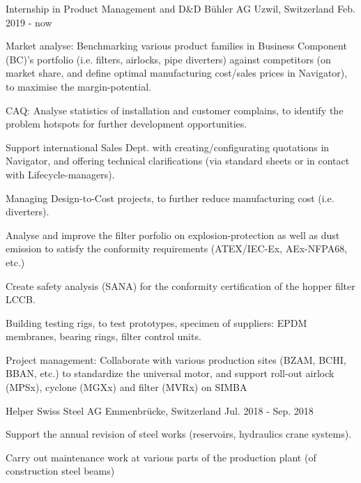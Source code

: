 

\begin{cventries}
	
\cventry
{Internship in Product Management and D\&D} %
{Bühler AG} %
{Uzwil, Switzerland} %
{Feb. 2019 - now} %
{
  \begin{cvitems} %
    \item {Market analyse: Benchmarking various product families in Business Component (BC)'s portfolio (i.e. filters, airlocks, pipe diverters) against competitors (on market share, and define optimal manufacturing cost/sales prices in Navigator), to maximise the margin-potential.}
    \item {CAQ: Analyse statistics of installation and customer complains, to identify the problem hotspots for further development opportunities.}
    \item {Support international Sales Dept. with creating/configurating quotations in Navigator, and offering technical clarifications (via standard sheets or in contact with Lifecycle-managers).}
    \item {Managing Design-to-Cost projects, to further reduce manufacturing cost (i.e. diverters).}
    \item {Analyse and improve the filter porfolio on explosion-protection as well as dust emission to satisfy the conformity requirements (ATEX/IEC-Ex, AEx-NFPA68, etc.)}
    \item {Create safety analysis (SANA) for the conformity certification of the hopper filter LCCB.}
    \item {Building testing rigs, to test prototypes, specimen of suppliers: EPDM membranes, bearing rings, filter control units.}
    \item {Project management: Collaborate with various production sites (BZAM, BCHI, BBAN, etc.) to standardize the universal motor, and support roll-out airlock (MPSx), cyclone (MGXx) and filter (MVRx) on SIMBA}
  \end{cvitems}
}

\cventry
  {Helper} %
  {Swiss Steel AG} %
  {Emmenbrücke, Switzerland} %
  {Jul. 2018 - Sep. 2018} %
  {
    \begin{cvitems} %
      \item {Support the annual revision of steel works (reservoirs, hydraulics crane systems).}
      \item {Carry out maintenance work at various parts of the production plant (of construction steel beams)}
    \end{cvitems}
} 


\end{cventries}
